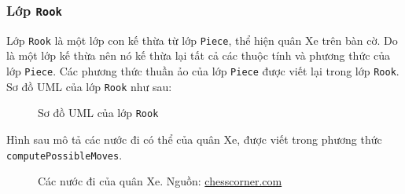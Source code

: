\subsubsection{Lớp \lstinline{Rook}}
Lớp \lstinline{Rook} là một lớp con kế thừa từ lớp \lstinline{Piece}, thể hiện quân Xe trên bàn cờ. Do là một lớp kế thừa nên nó kế thừa lại tất cả các thuộc tính và phương thức của lớp \lstinline{Piece}. Các phương thức thuần ảo của lớp \lstinline{Piece} được viết lại trong lớp \lstinline{Rook}.\\
Sơ đồ UML của lớp \lstinline{Rook} như sau:
\begin{figure}[H]
\caption{Sơ đồ UML của lớp \lstinline{Rook}}
\end{figure}
Hình sau mô tả các nước đi có thể của quân Xe, được viết trong phương thức \lstinline{computePossibleMoves}.
\begin{figure}[H]
\caption{Các nước đi của quân Xe. Nguồn: \url{chesscorner.com}}
\end{figure}

